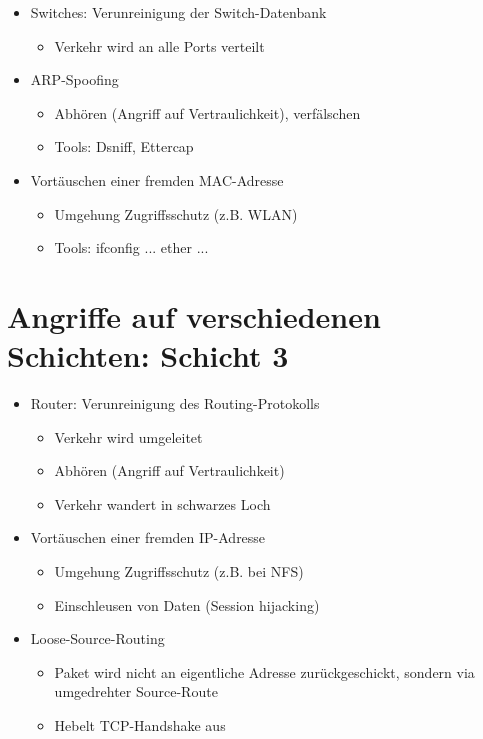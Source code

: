 \documentclass[openany]{book}
\begin{document}
\begin{itemize}
    \item Switches: Verunreinigung der Switch-Datenbank
    \begin{itemize}
        \item Verkehr wird an alle Ports verteilt
    \end{itemize}
    \item ARP-Spoofing
    \begin{itemize}
        \item Abhören (Angriff auf Vertraulichkeit), verfälschen
        \item Tools: Dsniff, Ettercap
    \end{itemize}
    \item Vortäuschen einer fremden MAC-Adresse
    \begin{itemize}
        \item Umgehung Zugriffsschutz (z.B. WLAN)
        \item Tools: ifconfig ... ether ...
    \end{itemize}
\end{itemize}

\section{Angriffe auf verschiedenen Schichten: Schicht 3}

\begin{itemize}
    \item Router: Verunreinigung des Routing-Protokolls
    \begin{itemize}
        \item Verkehr wird umgeleitet
        \item Abhören (Angriff auf Vertraulichkeit)
        \item Verkehr wandert in schwarzes Loch
    \end{itemize}
    \item Vortäuschen einer fremden IP-Adresse
    \begin{itemize}
        \item Umgehung Zugriffsschutz (z.B. bei NFS)
        \item Einschleusen von Daten (Session hijacking)
    \end{itemize}
    \item Loose-Source-Routing
    \begin{itemize}
        \item Paket wird nicht an eigentliche Adresse zurückgeschickt, sondern via umgedrehter Source-Route
        \item Hebelt TCP-Handshake aus
    \end{itemize}
\end{itemize}
\end{document}
